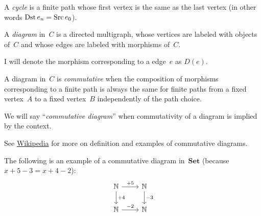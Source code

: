 \begin{defn}
A \emph{cycle} is a finite path whose first vertex is the same as
the last vertex (in other words $\operatorname{Dst} e_{n}=\operatorname{Src} e_{0}$).
\end{defn}

\begin{defn}
A \emph{diagram} in~$C$ is a directed multigraph, whose vertices
are labeled with objects of~$C$ and whose edges are labeled with
morphisms of~$C$.

I will denote the morphism corresponding to a edge~$e$ as $D(e)$.
\end{defn}

\begin{defn}
A diagram in~$C$ is \emph{commutative} when the composition of morphisms
corresponding to a finite path is always the same for finite paths
from a fixed vertex~$A$ to a fixed vertex~$B$ independently of the
path choice.

We will say ``\emph{commutative diagram}'' when commutativity of
a diagram is implied by the context.\end{defn}
\begin{rem}
See \href{https://en.wikipedia.org/wiki/Commutative_diagram}{Wikipedia}
for more on definition and examples of commutative diagrams.
\end{rem}
The following is an example of a commutative diagram in~$\mathbf{Set}$
(because $x+5-3=x+4-2$):
\[
\begin{tikzcd}
\mathbb{N} \arrow[r, "+5"] \arrow[d, "+4"] & \mathbb{N} \arrow[d, "-3"] \\
\mathbb{N} \arrow[r, "-2"] & \mathbb{N}
\end{tikzcd}
\]

